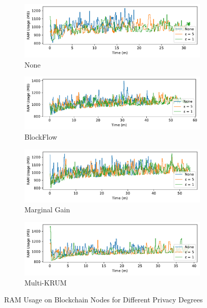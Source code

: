 \begin{figure}[!ht]
    \centering
    \begin{subfigure}[b]{0.49\textwidth}
        \centering
        \includegraphics[width=\textwidth]{graphics/05_priv_ram_none_miner.pdf}
        \caption{None}
    \end{subfigure}
    \hfill
    \begin{subfigure}[b]{0.49\textwidth}
        \centering
        \includegraphics[width=\textwidth]{graphics/05_priv_ram_blockflow_miner.pdf}
        \caption{BlockFlow}
    \end{subfigure}
    \hfill
    \begin{subfigure}[b]{0.49\textwidth}
        \centering
        \includegraphics[width=\textwidth]{graphics/05_priv_ram_marginalgain_miner.pdf}
        \caption{Marginal Gain}
    \end{subfigure}
    \hfill
    \begin{subfigure}[b]{0.49\textwidth}
        \centering
        \includegraphics[width=\textwidth]{graphics/05_priv_ram_multikrum_miner.pdf}
        \caption{Multi-KRUM}
    \end{subfigure}
    \caption{RAM Usage on Blockchain Nodes for Different Privacy Degrees}
    \label{fig:ram_priv_degree_miner}
\end{figure}






